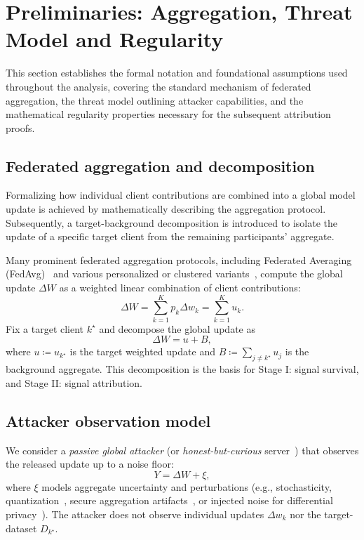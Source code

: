 \documentclass[bdcc,article,submit,pdftex]{Definitions/mdpi}
\newcommand{\tindex}{k^\star}
\newcommand{\uk}[1]{u_{#1}}
\newcommand{\utarget}{u}
\newcommand{\ukstar}{\uk{\tindex}}
\newcommand{\pdelta}[1]{p_{#1}\Delta w_{#1}}
\begin{document}
\section{Preliminaries: Aggregation, Threat Model and Regularity}
\label{sec:preliminaries}

This section establishes the formal notation and foundational assumptions used throughout the analysis, covering the standard mechanism of federated aggregation, the threat model outlining attacker capabilities, and the mathematical regularity properties necessary for the subsequent attribution proofs.

\subsection{Federated aggregation and decomposition}

Formalizing how individual client contributions are combined into a global model update is achieved by mathematically describing the aggregation protocol. Subsequently, a target-background decomposition is introduced to isolate the update of a specific target client from the remaining participants' aggregate.

Many prominent federated aggregation protocols, including Federated Averaging (FedAvg)~\cite{mcmahan2017communication} and various personalized or clustered variants~\cite{kairouz2021advances}, compute the global update $\Delta W$ as a weighted linear combination of client contributions:
\begin{equation}
\label{eq:fedavg}
\Delta W = \sum_{k=1}^K \pdelta{k} = \sum_{k=1}^K \uk{k}.
\end{equation}
Fix a target client $\tindex$ and decompose the global update as
\begin{equation}
\label{eq:decomp}
\Delta W = \utarget + B,
\end{equation}
where $\utarget \coloneqq \ukstar$ is the target weighted update and $B \coloneqq \sum_{j\neq \tindex} \uk{j}$ is the background aggregate.
This decomposition is the basis for Stage I: signal survival, and Stage II: signal attribution.

\subsection{Attacker observation model}

We consider a \textit{passive global attacker} (or \textit{honest-but-curious} server~\cite{mothukuri2021survey,kairouz2021advances}) that observes the released update up to a noise floor:
\begin{equation}
\label{eq:obs}
Y=\Delta W+\xi,
\end{equation}
where $\xi$ models aggregate uncertainty and perturbations (e.g., stochasticity, quantization~\cite{kang2024effect}, secure aggregation artifacts~\cite{gilbert2022secure}, or injected noise for differential privacy~\cite{kim2022effects}).
The attacker does not observe individual updates $\Delta w_k$ nor the target-dataset $D_{\tindex}$.
\end{document}
